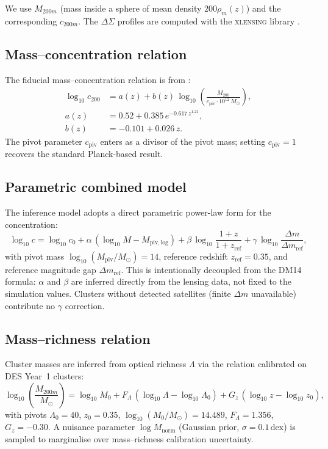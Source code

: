 \documentclass[12pt,a4paper]{article}
\begin{document}
We use $M_{200m}$ (mass inside a sphere of mean density $200\rho_m(z)$) and the
corresponding $c_{200m}$.  The $\Delta\Sigma$ profiles are computed with the
\textsc{xlensing} library \citep{xlensing}.

\subsection{Mass--concentration relation}

The fiducial mass--concentration relation is from \citet{DuttonMaccio2014}:
\begin{align}
  \log_{10}c_{200} &= a(z) + b(z)\,\log_{10}\!\left(\frac{M_{200}}{c_\mathrm{piv}\cdot 10^{12}\,M_\odot}\right), \label{eq:DM14}\\
  a(z) &= 0.52 + 0.385\,e^{-0.617\,z^{1.21}}, \nonumber\\
  b(z) &= -0.101 + 0.026\,z. \nonumber
\end{align}
The pivot parameter $c_\mathrm{piv}$ enters as a divisor of the pivot mass; setting
$c_\mathrm{piv}=1$ recovers the standard Planck-based result.

\subsection{Parametric combined model}

The inference model adopts a direct parametric power-law form for the concentration:
\begin{equation}
  \log_{10}c = \log_{10}c_0
    + \alpha\,(\log_{10}M - M_\mathrm{piv,log})
    + \beta\,\log_{10}\!\frac{1+z}{1+z_\mathrm{ref}}
    + \gamma\,\log_{10}\!\frac{\Delta m}{\Delta m_\mathrm{ref}},
  \label{eq:combined_model}
\end{equation}
with pivot mass $\log_{10}(M_\mathrm{piv}/M_\odot)=14$, reference redshift
$z_\mathrm{ref}=0.35$, and reference magnitude gap $\Delta m_\mathrm{ref}$.  This is
intentionally decoupled from the DM14 formula: $\alpha$ and $\beta$ are inferred
directly from the lensing data, not fixed to the simulation values.  Clusters without
detected satellites (finite $\Delta m$ unavailable) contribute no $\gamma$ correction.

\subsection{Mass--richness relation}

Cluster masses are inferred from optical richness $\Lambda$ via the
\citet{McClintock2018} relation calibrated on DES Year~1 clusters:
\begin{equation}
  \log_{10}\!\left(\frac{M_{200m}}{M_\odot}\right) = \log_{10}M_0
    + F_\Lambda\,(\log_{10}\Lambda - \log_{10}\Lambda_0)
    + G_z\,(\log_{10}z - \log_{10}z_0),
  \label{eq:mclintock}
\end{equation}
with pivots $\Lambda_0=40$, $z_0=0.35$, $\log_{10}(M_0/M_\odot)=14.489$,
$F_\Lambda=1.356$, $G_z=-0.30$.  A nuisance parameter $\log M_\mathrm{norm}$
(Gaussian prior, $\sigma=0.1\,\mathrm{dex}$) is sampled to marginalise over
mass--richness calibration uncertainty.
\end{document}
